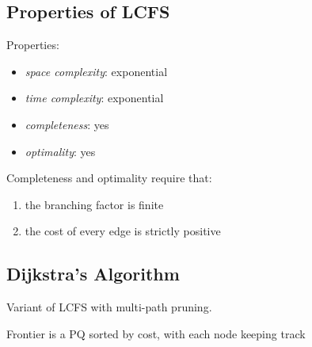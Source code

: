 \documentclass[11pt]{article}
\begin{document}
\subsection{Properties of LCFS}
\label{sec:orgcc2f058}
Properties:
\begin{itemize}
\item \emph{space complexity}: exponential
\item \emph{time complexity}: exponential
\item \emph{completeness}: yes
\item \emph{optimality}: yes
\end{itemize}

Completeness and optimality require that:
\begin{enumerate}
\item the branching factor is finite
\item the cost of every edge is strictly positive
\end{enumerate}
\subsection{Dijkstra's Algorithm}
\label{sec:org457a783}
Variant of LCFS with multi-path pruning.

Frontier is a PQ sorted by cost, with each node keeping track
\end{document}

